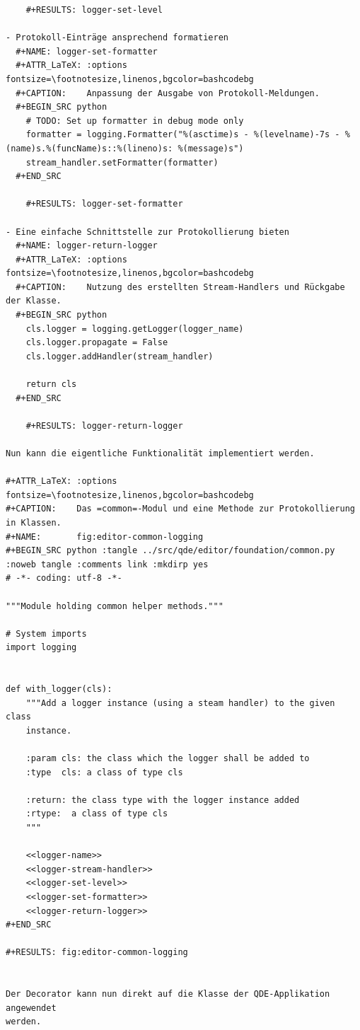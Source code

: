 \documentclass[10pt, openright, notitlepage]{scrreprt}
\begin{document}
\begin{verbatim}
    #+RESULTS: logger-set-level

- Protokoll-Einträge ansprechend formatieren
  #+NAME: logger-set-formatter
  #+ATTR_LaTeX: :options fontsize=\footnotesize,linenos,bgcolor=bashcodebg
  #+CAPTION:    Anpassung der Ausgabe von Protokoll-Meldungen.
  #+BEGIN_SRC python
    # TODO: Set up formatter in debug mode only
    formatter = logging.Formatter("%(asctime)s - %(levelname)-7s - %(name)s.%(funcName)s::%(lineno)s: %(message)s")
    stream_handler.setFormatter(formatter)
  #+END_SRC

    #+RESULTS: logger-set-formatter

- Eine einfache Schnittstelle zur Protokollierung bieten
  #+NAME: logger-return-logger
  #+ATTR_LaTeX: :options fontsize=\footnotesize,linenos,bgcolor=bashcodebg
  #+CAPTION:    Nutzung des erstellten Stream-Handlers und Rückgabe der Klasse.
  #+BEGIN_SRC python
    cls.logger = logging.getLogger(logger_name)
    cls.logger.propagate = False
    cls.logger.addHandler(stream_handler)

    return cls
  #+END_SRC

    #+RESULTS: logger-return-logger

Nun kann die eigentliche Funktionalität implementiert werden.

#+ATTR_LaTeX: :options fontsize=\footnotesize,linenos,bgcolor=bashcodebg
#+CAPTION:    Das =common=-Modul und eine Methode zur Protokollierung in Klassen.
#+NAME:       fig:editor-common-logging
#+BEGIN_SRC python :tangle ../src/qde/editor/foundation/common.py :noweb tangle :comments link :mkdirp yes
# -*- coding: utf-8 -*-

"""Module holding common helper methods."""

# System imports
import logging


def with_logger(cls):
    """Add a logger instance (using a steam handler) to the given class
    instance.

    :param cls: the class which the logger shall be added to
    :type  cls: a class of type cls

    :return: the class type with the logger instance added
    :rtype:  a class of type cls
    """

    <<logger-name>>
    <<logger-stream-handler>>
    <<logger-set-level>>
    <<logger-set-formatter>>
    <<logger-return-logger>>
#+END_SRC

#+RESULTS: fig:editor-common-logging


Der Decorator kann nun direkt auf die Klasse der QDE-Applikation angewendet
werden.



\end{verbatim}
\end{document}
